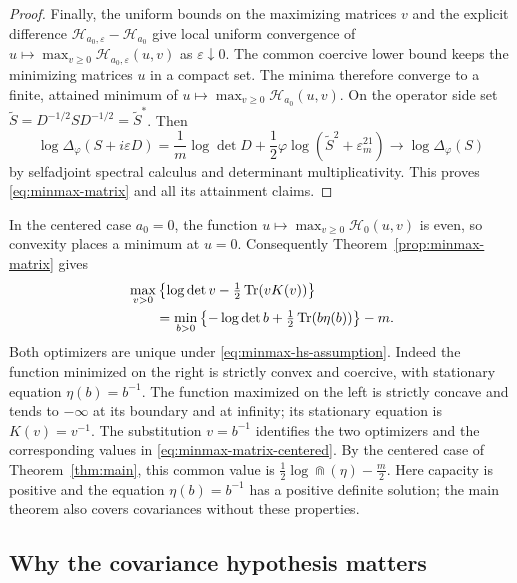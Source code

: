 \begin{proof}
Finally, the uniform bounds on the maximizing matrices $v$ and the explicit difference $\mathcal H_{a_0,\varepsilon}-\mathcal H_{a_0}$ give local uniform convergence of $u\mapsto\max_{v\ge0}\mathcal H_{a_0,\varepsilon}(u,v)$ as $\varepsilon\downarrow0$.
The common coercive lower bound keeps the minimizing matrices $u$ in a compact set.
The minima therefore converge to a finite, attained minimum of $u\mapsto\max_{v\ge0}\mathcal H_{a_0}(u,v)$.
On the operator side set $\widetilde S=D^{-1/2}SD^{-1/2}=\widetilde S^*$.
Then
\[
 \log\Delta_\varphi(S+i\varepsilon D)
 =\frac1m\log\det D
   +\frac12\varphi\log(\widetilde S^2+\varepsilon^21_m)
 \longrightarrow\log\Delta_\varphi(S)
\]
by selfadjoint spectral calculus and determinant multiplicativity.
This proves \eqref{eq:minmax-matrix} and all its attainment claims.
\end{proof}

In the centered case $a_0=0$, the function $u\mapsto\max_{v\ge0}\mathcal H_0(u,v)$ is even, so convexity places a minimum at $u=0$.
Consequently Theorem~\ref{prop:minmax-matrix} gives
\begin{equation}\label{eq:minmax-matrix-centered}
\begin{split}
 &\max_{v>0}\left\{\log\det v-\tfrac12\operatorname{Tr}(vK(v))\right\}\\
 &\qquad=\min_{b>0}\left\{-\log\det b+\tfrac12\operatorname{Tr}(b\eta(b))\right\}-m.
\end{split}
\end{equation}
Both optimizers are unique under \eqref{eq:minmax-hs-assumption}.
Indeed the function minimized on the right is strictly convex and coercive, with stationary equation $\eta(b)=b^{-1}$.
The function maximized on the left is strictly concave and tends to $-\infty$ at its boundary and at infinity; its stationary equation is $K(v)=v^{-1}$.
The substitution $v=b^{-1}$ identifies the two optimizers and the corresponding values in \eqref{eq:minmax-matrix-centered}.
By the centered case of Theorem~\ref{thm:main}, this common value is $\frac12\log\Cap(\eta)-\frac m2$.
Here capacity is positive and the equation $\eta(b)=b^{-1}$ has a positive definite solution; the main theorem also covers covariances without these properties.

\subsection{Why the covariance hypothesis matters}

